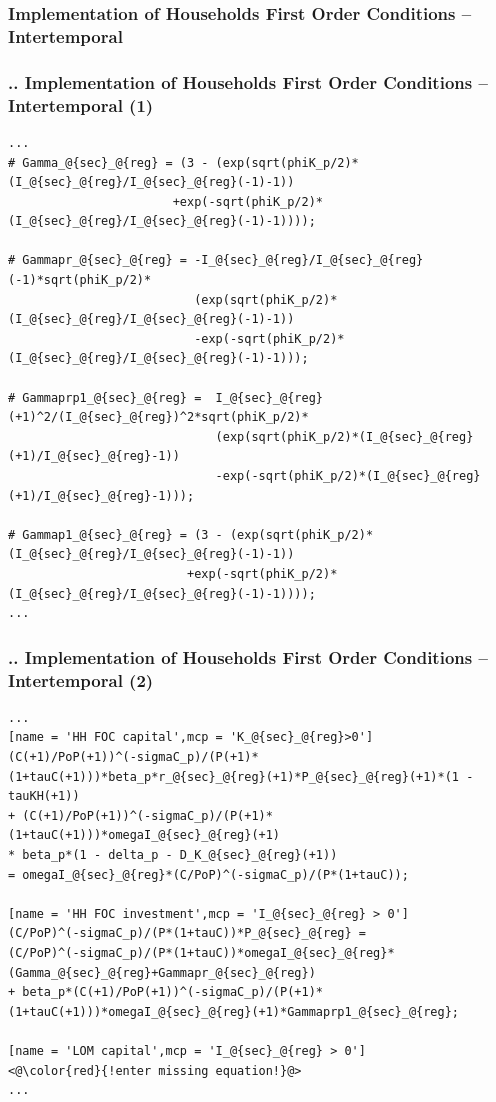 \documentclass[11pt,aspectratio=169]{beamer}
\begin{document}
\subsubsection{Implementation of Households First Order Conditions -- Intertemporal}
\begin{frame}[fragile]
\frametitle{{\thesection.\thesubsection.\thesubsubsection} Implementation of Households First Order Conditions -- Intertemporal (1)}

\begin{lstlisting}[frame = single]
...
# Gamma_@{sec}_@{reg} = (3 - (exp(sqrt(phiK_p/2)*(I_@{sec}_@{reg}/I_@{sec}_@{reg}(-1)-1))
                       +exp(-sqrt(phiK_p/2)*(I_@{sec}_@{reg}/I_@{sec}_@{reg}(-1)-1))));
												
# Gammapr_@{sec}_@{reg} = -I_@{sec}_@{reg}/I_@{sec}_@{reg}(-1)*sqrt(phiK_p/2)*
                          (exp(sqrt(phiK_p/2)*(I_@{sec}_@{reg}/I_@{sec}_@{reg}(-1)-1))
                          -exp(-sqrt(phiK_p/2)*(I_@{sec}_@{reg}/I_@{sec}_@{reg}(-1)-1)));
													
# Gammaprp1_@{sec}_@{reg} =  I_@{sec}_@{reg}(+1)^2/(I_@{sec}_@{reg})^2*sqrt(phiK_p/2)*
                             (exp(sqrt(phiK_p/2)*(I_@{sec}_@{reg}(+1)/I_@{sec}_@{reg}-1)) 
                             -exp(-sqrt(phiK_p/2)*(I_@{sec}_@{reg}(+1)/I_@{sec}_@{reg}-1)));
														
# Gammap1_@{sec}_@{reg} = (3 - (exp(sqrt(phiK_p/2)*(I_@{sec}_@{reg}/I_@{sec}_@{reg}(-1)-1))
                         +exp(-sqrt(phiK_p/2)*(I_@{sec}_@{reg}/I_@{sec}_@{reg}(-1)-1))));
...
\end{lstlisting}
\end{frame}

\begin{frame}[fragile]
\frametitle{{\thesection.\thesubsection.\thesubsubsection} Implementation of Households First Order Conditions -- Intertemporal (2)}

\begin{lstlisting}[frame = single]
...
[name = 'HH FOC capital',mcp = 'K_@{sec}_@{reg}>0']
(C(+1)/PoP(+1))^(-sigmaC_p)/(P(+1)*(1+tauC(+1)))*beta_p*r_@{sec}_@{reg}(+1)*P_@{sec}_@{reg}(+1)*(1 - tauKH(+1))
+ (C(+1)/PoP(+1))^(-sigmaC_p)/(P(+1)*(1+tauC(+1)))*omegaI_@{sec}_@{reg}(+1) 
* beta_p*(1 - delta_p - D_K_@{sec}_@{reg}(+1))
= omegaI_@{sec}_@{reg}*(C/PoP)^(-sigmaC_p)/(P*(1+tauC));

[name = 'HH FOC investment',mcp = 'I_@{sec}_@{reg} > 0']       
(C/PoP)^(-sigmaC_p)/(P*(1+tauC))*P_@{sec}_@{reg} = 
(C/PoP)^(-sigmaC_p)/(P*(1+tauC))*omegaI_@{sec}_@{reg}*(Gamma_@{sec}_@{reg}+Gammapr_@{sec}_@{reg})
+ beta_p*(C(+1)/PoP(+1))^(-sigmaC_p)/(P(+1)*(1+tauC(+1)))*omegaI_@{sec}_@{reg}(+1)*Gammaprp1_@{sec}_@{reg};
				
[name = 'LOM capital',mcp = 'I_@{sec}_@{reg} > 0']
<@\color{red}{!enter missing equation!}@>
...
\end{lstlisting}
\end{frame}
\end{document}
